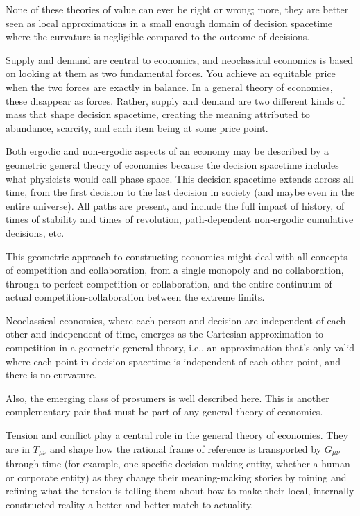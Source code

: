 None of these theories of value can ever be right or wrong; more, they are better seen as local approximations in a small enough domain of decision spacetime where the curvature is negligible compared to the outcome of decisions. 


Supply and demand are central to economics, and neoclassical economics is based on looking at them as two fundamental forces. You achieve an equitable price when the two forces are exactly in balance. In a general theory of economies, these disappear as forces. Rather, supply and demand are two different kinds of mass that shape decision spacetime, creating the meaning attributed to abundance, scarcity, and each item being at some price point.


Both ergodic and non\hyp{}ergodic aspects of an economy may be described by a geometric general theory of economies because the decision spacetime includes what physicists would call phase space. This decision spacetime extends across all time, from the first decision to the last decision in society (and maybe even in the entire universe). All paths are present, and include the full impact of history, of times of stability and times of revolution, path\hyp{}dependent non\hyp{}ergodic cumulative decisions, etc.


This geometric approach  to constructing economics might deal with all concepts of competition and collaboration, from a single monopoly and no collaboration, through to perfect competition or collaboration, and the entire continuum of actual competition\hyp{}collaboration between the extreme limits. 


Neoclassical economics, where each person and decision are independent of each other and independent of time, emerges as the Cartesian approximation to competition in a geometric general theory, i.e., an approximation that’s only valid where each point in decision spacetime is independent of each other point, and there is no curvature. 


Also, the emerging class of prosumers is well described here. This is another complementary pair that must be part of any general theory of economies.


Tension and conflict play a central role in the general theory of economies. They are in $T_{\mu\nu}$ and shape how the rational frame of reference  is transported by $G_{\mu\nu}$ through time (for example, one specific decision\hyp{}making entity, whether a human or corporate entity) as they change their meaning\hyp{}making stories by mining and refining what the tension is telling them about how to make their local, internally constructed reality a better and better match to actuality.


